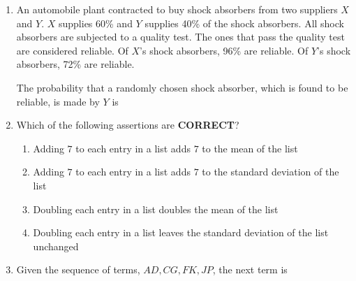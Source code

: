 \documentclass[journal]{IEEEtran}
\numberwithin{equation}{enumi}
\numberwithin{figure}{enumi}
\begin{document}
\begin{enumerate}
\item  An automobile plant contracted to buy shock absorbers from two suppliers $X$ and $Y$.  
$X$ supplies 60\% and $Y$ supplies 40\% of the shock absorbers.  
All shock absorbers are subjected to a quality test. The ones that pass the quality test are considered reliable.  
Of $X$'s shock absorbers, 96\% are reliable. Of $Y$'s shock absorbers, 72\% are reliable.  

The probability that a randomly chosen shock absorber, which is found to be reliable, is made by $Y$ is

\begin{enumerate}
\end{enumerate}

\item  Which of the following assertions are \textbf{CORRECT}?  

\begin{enumerate}
\item Adding $7$ to each entry in a list adds $7$ to the mean of the list  
\item Adding $7$ to each entry in a list adds $7$ to the standard deviation of the list  
\item Doubling each entry in a list doubles the mean of the list  
\item Doubling each entry in a list leaves the standard deviation of the list unchanged  
\end{enumerate}

\begin{enumerate}
\end{enumerate}

\item Given the sequence of terms, $AD, CG, FK, JP$, the next term is  

\begin{enumerate}
\end{enumerate}


\end{enumerate}
\end{document}
